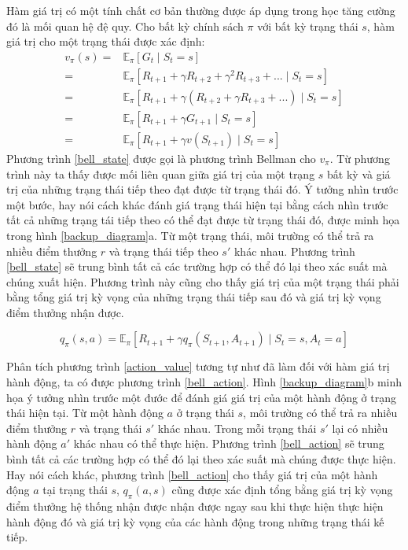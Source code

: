 Hàm giá trị có một tính chất cơ bản thường được áp dụng trong học tăng cường đó là mối quan hệ đệ quy. Cho bất kỳ chính sách $\pi$ với bất kỳ trạng thái $s$, hàm giá trị cho một trạng thái được xác định:	
\begin{align}
\label{bell_state}
v_{\pi}(s) = {}& \mathbb{E}_{\pi}\left [\mathit{G}_t \mid \mathit{S}_{t} = s\right ] \nonumber \\
= {}& \mathbb{E}_{\pi}\left [ \mathit{R}_{t+1} + \gamma \mathit{R}_{t+2} + \gamma^{2} \mathit{R}_{t+3} + ... \mid \mathit{S}_t = s  \right ] \nonumber \\
= {}& \mathbb{E}_{\pi}\left [ \mathit{R}_{t+1} + \gamma( {R}_{t+2} + \gamma \mathit{R}_{t+3} + ...) \mid \mathit{S}_t = s  \right ] \nonumber \\
= {}& \mathbb{E}_{\pi}\left [ \mathit{R}_{t+1} + \gamma\mathit{G}_{t + 1} \mid \mathit{S}_t = s  \right ] \nonumber \\
= {}& \mathbb{E}_{\pi}\left [ \mathit{R}_{t+1} + \gamma v(\mathit{S}_{t+1}) \mid \mathit{S}_t = s  \right ]
\end{align}	
Phương trình \ref{bell_state} được gọi là phương trình Bellman cho $v_{\pi}$. Từ phương trình này ta thấy được mối liên quan giữa giá trị của một trạng $s$ bất kỳ và giá trị của những trạng thái tiếp theo đạt được từ trạng thái đó. Ý tưởng nhìn trước một bước, hay nói cách khác đánh giá trạng thái hiện tại bằng cách nhìn trước tất cả những trạng tái tiếp theo có thể đạt được từ trạng thái đó, được minh họa trong hình \ref{backup_diagram}a. Từ một trạng thái, môi trường có thể trả ra nhiều điểm thưởng $r$ và trạng thái tiếp theo $s'$ khác nhau. Phương trình \ref{bell_state} sẽ trung bình tất cả các trường hợp có thể đó lại theo xác suất mà chúng xuất hiện. Phương trình này cũng cho thấy giá trị của một trạng thái phải bằng tổng giá trị kỳ vọng của những trạng thái tiếp sau đó và giá trị kỳ vọng điểm thưởng nhận được.

\begin{equation}
\label{bell_action}
q_{\pi}(s,a) = \mathbb{E}_{\pi} \left[\mathit{R}_{t+1} + \gamma q_{\pi}(\mathit{S}_{t+1}, \mathit{A}_{t+1}) \mid \mathit{S}_t = s, \mathit{A}_t = a \right]
\end{equation}

Phân tích phương trình \ref{action_value} tương tự như đã làm đối với hàm giá trị hành động, ta có được phương trình \ref{bell_action}. Hình \ref{backup_diagram}b minh họa ý tưởng nhìn trước một đước để đánh giá giá trị của một hành động ở trạng thái hiện tại. Từ một hành động $a$ ở trạng thái $s$, môi trường có thể trả ra nhiều điểm thưởng $r$ và trạng thái $s'$ khác nhau. Trong mỗi trạng thái $s'$ lại có nhiều hành động $a'$ khác nhau có thể thực hiện.	Phương trình \ref{bell_action} sẽ trung bình tất cả các trường hợp có thể đó lại theo xác suất mà chúng được thực hiện. Hay nói cách khác, phương trình \ref{bell_action} cho thấy giá trị của một hành động $a$ tại trạng thái $s$, $q_{\pi}(a,s)$ cũng được xác định tổng bằng giá trị kỳ vọng điểm thưởng hệ thống nhận được nhận được ngay sau khi thực hiện thực hiện hành động đó và giá trị kỳ vọng của các hành động trong những trạng thái kế tiếp.


